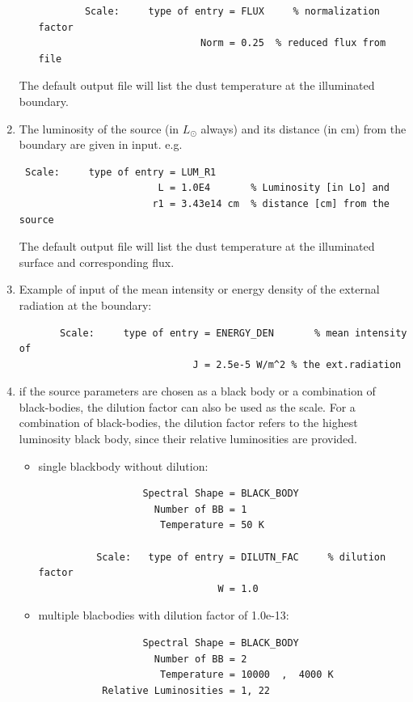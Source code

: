 \documentclass[11pt]{article}
\begin{document}
\begin{enumerate}
\begin{itemize}
\begin{verbatim}
        Scale:     type of entry = FLUX     % normalization factor
                            Norm = 0.25  % reduced flux from file
\end{verbatim}
\end{itemize}
The default output file will list the dust temperature at the illuminated boundary.
%
\item
The luminosity of the source (in $L_\odot$ always) and its distance (in cm) from the boundary 
are given in input. e.g.
\begin{verbatim}
 Scale:     type of entry = LUM_R1
                        L = 1.0E4       % Luminosity [in Lo] and
                       r1 = 3.43e14 cm  % distance [cm] from the source
\end{verbatim}
%
The default output file will list the dust temperature at the illuminated surface and corresponding flux.
%
\item
  Example of input of the mean intensity or energy density of the external radiation at the boundary:
\begin{verbatim}
       Scale:     type of entry = ENERGY_DEN       % mean intensity of
                              J = 2.5e-5 W/m^2 % the ext.radiation
\end{verbatim}
%
\item
if the source parameters are chosen as a black body or a combination of black-bodies, the dilution
factor can also be used as the scale. For a combination of black-bodies, the dilution factor
refers to the highest luminosity black body, since their relative luminosities are provided.
\begin{itemize}
\item
single blackbody without dilution:
\begin{verbatim}
                  Spectral Shape = BLACK_BODY
                    Number of BB = 1
                     Temperature = 50 K

          Scale:   type of entry = DILUTN_FAC     % dilution factor
                               W = 1.0
\end{verbatim}
%
\item
multiple blacbodies with dilution factor of 1.0e-13:
\begin{verbatim}
                  Spectral Shape = BLACK_BODY
                    Number of BB = 2
                     Temperature = 10000  ,  4000 K
           Relative Luminosities = 1, 22


\end{verbatim}
\end{itemize}
\end{enumerate}
\end{document}
